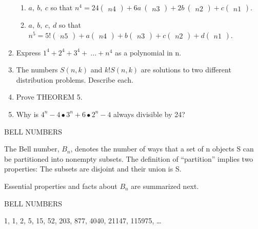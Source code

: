 \documentclass[10pt,letter]{article}
\begin{document}
\begin{enumerate}
\begin{enumerate}
  \item
    \(a,\ b,\ c\) so that \(n^{4} = 24
\begin{pmatrix}
    n
    4
    \end{pmatrix}
 + 6a\
\begin{pmatrix}
    n
    3
    \end{pmatrix}
 + 2b\
\begin{pmatrix}
    n
    2
    \end{pmatrix}
 + c
\begin{pmatrix}
    n
    1
    \end{pmatrix}
\).
  \item
    \(a,\ b,\ c,\ d\) so that \(n^{5} = 5!
\begin{pmatrix}
    n
    5
    \end{pmatrix}
 + a
\begin{pmatrix}
    n
    4
    \end{pmatrix}
 + b
\begin{pmatrix}
    n
    3
    \end{pmatrix}
 + c
\begin{pmatrix}
    n
    2
    \end{pmatrix}
 + d
\begin{pmatrix}
    n
    1
    \end{pmatrix}
\).

\end{enumerate}
\item
  Express \(1^{4} + 2^{4} + 3^{4} + \ \ldots + n^{4}\) as a polynomial
  in n.
\item
  The numbers \(S(n,k)\) and \(k!S(n,k)\) are solutions to two different
  distribution problems. Describe each.
\item
  Prove THEOREM 5.
\item
  Why is \(4^{n} - 4 \bullet 3^{n} + 6 \bullet 2^{n} - 4\) always
  divisible by 24?

\end{enumerate}

BELL NUMBERS

The Bell number, \(B_{n}\), denotes the number of ways that a set of n
objects S can be partitioned into nonempty subsets. The definition of
``partition'' implies two properties: The subsets are disjoint and their
union is S.

Essential properties and facts about \(B_{n}\) are summarized next.

BELL NUMBERS

1, 1, 2, 5, 15, 52, 203, 877, 4040, 21147, 115975, \ldots{}
\end{document}

